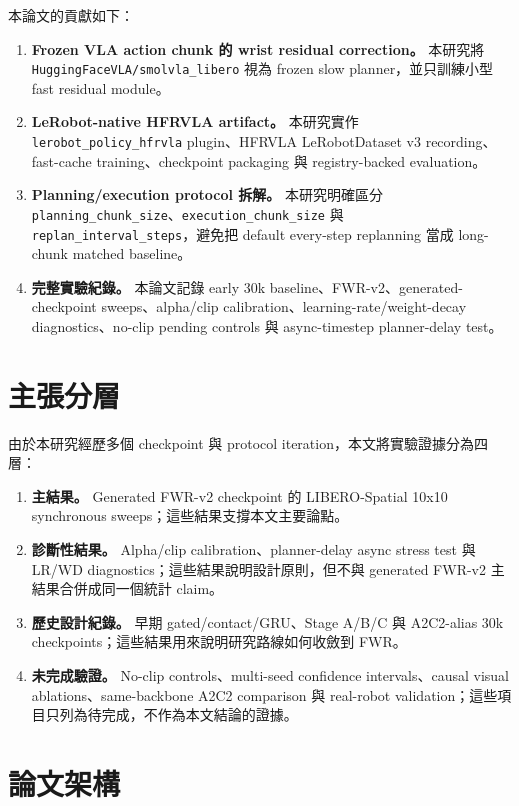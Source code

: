 \documentclass[12pt,a4paper,oneside]{report}
\begin{document}
本論文的貢獻如下：
\begin{enumerate}[leftmargin=2em]
  \item \textbf{Frozen VLA action chunk 的 wrist residual correction。} 本研究將 \texttt{HuggingFaceVLA/smolvla\_libero} 視為 frozen slow planner，並只訓練小型 fast residual module。
  \item \textbf{LeRobot-native HFRVLA artifact。} 本研究實作 \texttt{lerobot\_policy\_hfrvla} plugin、HFRVLA LeRobotDataset v3 recording、fast-cache training、checkpoint packaging 與 registry-backed evaluation。
  \item \textbf{Planning/execution protocol 拆解。} 本研究明確區分 \texttt{planning\_chunk\_size}、\texttt{execution\_chunk\_size} 與 \texttt{replan\_interval\_steps}，避免把 default every-step replanning 當成 long-chunk matched baseline。
  \item \textbf{完整實驗紀錄。} 本論文記錄 early 30k baseline、FWR-v2、generated-checkpoint sweeps、alpha/clip calibration、learning-rate/weight-decay diagnostics、no-clip pending controls 與 async-timestep planner-delay test。
\end{enumerate}

\section{主張分層}

由於本研究經歷多個 checkpoint 與 protocol iteration，本文將實驗證據分為四層：
\begin{enumerate}[leftmargin=2em]
  \item \textbf{主結果。} Generated FWR-v2 checkpoint 的 LIBERO-Spatial 10x10 synchronous sweeps；這些結果支撐本文主要論點。
  \item \textbf{診斷性結果。} Alpha/clip calibration、planner-delay async stress test 與 LR/WD diagnostics；這些結果說明設計原則，但不與 generated FWR-v2 主結果合併成同一個統計 claim。
  \item \textbf{歷史設計紀錄。} 早期 gated/contact/GRU、Stage A/B/C 與 A2C2-alias 30k checkpoints；這些結果用來說明研究路線如何收斂到 FWR。
  \item \textbf{未完成驗證。} No-clip controls、multi-seed confidence intervals、causal visual ablations、same-backbone A2C2 comparison 與 real-robot validation；這些項目只列為待完成，不作為本文結論的證據。
\end{enumerate}

\section{論文架構}
\end{document}
